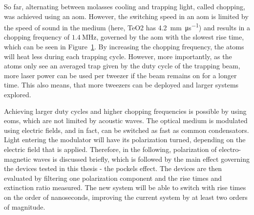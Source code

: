 So far, alternating between molasses cooling and trapping light, called chopping, was achieved using an \ac{aom}. However, the switching speed in an \ac{aom} is limited by the speed of sound in the medium (here, TeO2 has \SI{4.2}{\milli\meter\per\micro\second}) and results in a chopping frequency of $\SI{1.4}{\mega\hertz}$, governed by the \ac{aom} with the slowest rise time, which can be seen in Figure~\ref{fig:aom_chopping}. By increasing the chopping frequency, the atoms will heat less during each trapping cycle. However, more importantly, as the atoms only see an averaged trap given by the duty cycle of the trapping beam, more laser power can be used per tweezer if the beam remains on for a longer time. This also means, that more tweezers can be deployed and larger systems explored.

\begin{figure}[t]
	\label{fig:aom_chopping}
\end{figure}

Achieving larger duty cycles and higher chopping frequencies is possible by using \acp{eom}, which are not limited by acoustic waves. The optical medium is modulated using electric fields, and in fact, can be switched as fast as common condensators. Light entering the modulator will have its polarization turned, depending on the electric field that is applied. Therefore, in the following, polarization of electro-magnetic waves is discussed briefly, which is followed by the main effect governing the devices tested in this thesis - the pockels effect. The devices are then evaluated by filtering one polarization component and the rise times and extinction ratio measured. The new system will be able to switch with rise times on the order of nanoseconds, improving the current system by at least two orders of magnitude.

